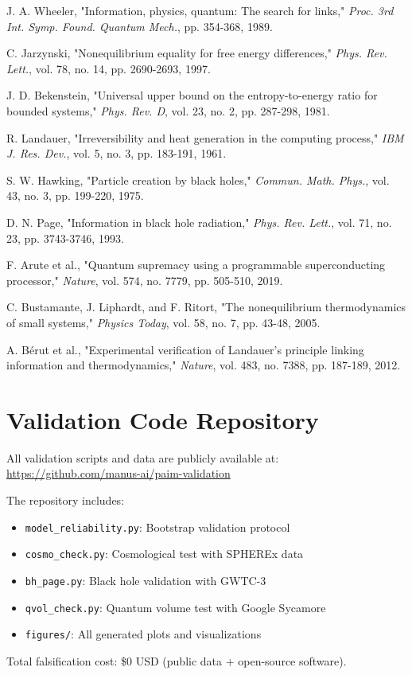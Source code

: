 \documentclass[twocolumn,10pt]{IEEEtran}
\begin{document}
\begin{thebibliography}{9}

J. A. Wheeler, "Information, physics, quantum: The search for links," \textit{Proc. 3rd Int. Symp. Found. Quantum Mech.}, pp. 354-368, 1989.

C. Jarzynski, "Nonequilibrium equality for free energy differences," \textit{Phys. Rev. Lett.}, vol. 78, no. 14, pp. 2690-2693, 1997.

J. D. Bekenstein, "Universal upper bound on the entropy-to-energy ratio for bounded systems," \textit{Phys. Rev. D}, vol. 23, no. 2, pp. 287-298, 1981.

R. Landauer, "Irreversibility and heat generation in the computing process," \textit{IBM J. Res. Dev.}, vol. 5, no. 3, pp. 183-191, 1961.

S. W. Hawking, "Particle creation by black holes," \textit{Commun. Math. Phys.}, vol. 43, no. 3, pp. 199-220, 1975.

D. N. Page, "Information in black hole radiation," \textit{Phys. Rev. Lett.}, vol. 71, no. 23, pp. 3743-3746, 1993.

F. Arute et al., "Quantum supremacy using a programmable superconducting processor," \textit{Nature}, vol. 574, no. 7779, pp. 505-510, 2019.

C. Bustamante, J. Liphardt, and F. Ritort, "The nonequilibrium thermodynamics of small systems," \textit{Physics Today}, vol. 58, no. 7, pp. 43-48, 2005.

A. Bérut et al., "Experimental verification of Landauer's principle linking information and thermodynamics," \textit{Nature}, vol. 483, no. 7388, pp. 187-189, 2012.

\end{thebibliography}

\appendix

\section{Validation Code Repository}

All validation scripts and data are publicly available at:
\url{https://github.com/manus-ai/paim-validation}

The repository includes:
\begin{itemize}
\item \texttt{model\_reliability.py}: Bootstrap validation protocol
\item \texttt{cosmo\_check.py}: Cosmological test with SPHEREx data
\item \texttt{bh\_page.py}: Black hole validation with GWTC-3
\item \texttt{qvol\_check.py}: Quantum volume test with Google Sycamore
\item \texttt{figures/}: All generated plots and visualizations
\end{itemize}

Total falsification cost: \$0 USD (public data + open-source software).
\end{document}
